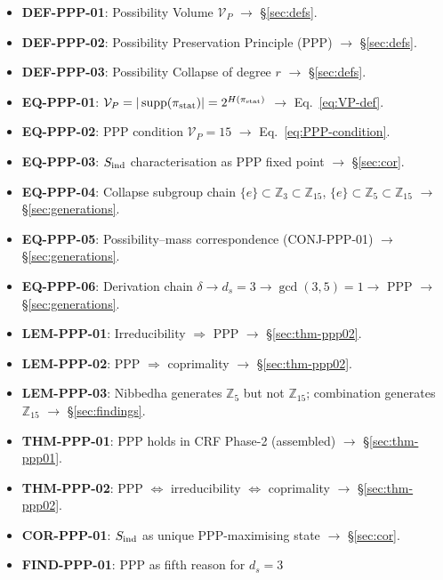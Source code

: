 \documentclass[12pt, a4paper]{article}
\begin{document}
\begin{formalbox}[title={Atomic units introduced by TASK-ZC13}]
\begin{itemize}[leftmargin=*]
  \item \textbf{DEF-PPP-01}: Possibility Volume $\mathcal{V}_P$
    $\to$ \S\ref{sec:defs}.
  \item \textbf{DEF-PPP-02}: Possibility Preservation Principle (PPP)
    $\to$ \S\ref{sec:defs}.
  \item \textbf{DEF-PPP-03}: Possibility Collapse of degree $r$
    $\to$ \S\ref{sec:defs}.
  \item \textbf{EQ-PPP-01}: $\mathcal{V}_P = |\operatorname{supp}
    (\pi_{\rm stat})| = 2^{H(\pi_{\rm stat})}$
    $\to$ Eq.~\eqref{eq:VP-def}.
  \item \textbf{EQ-PPP-02}: PPP condition $\mathcal{V}_P = 15$
    $\to$ Eq.~\eqref{eq:PPP-condition}.
  \item \textbf{EQ-PPP-03}: $S_{\rm ind}$ characterisation as
    PPP fixed point $\to$ \S\ref{sec:cor}.
  \item \textbf{EQ-PPP-04}: Collapse subgroup chain
    $\{e\} \subset \mathbb{Z}_3 \subset \mathbb{Z}_{15}$,
    $\{e\} \subset \mathbb{Z}_5 \subset \mathbb{Z}_{15}$
    $\to$ \S\ref{sec:generations}.
  \item \textbf{EQ-PPP-05}: Possibility--mass correspondence
    (CONJ-PPP-01) $\to$ \S\ref{sec:generations}.
  \item \textbf{EQ-PPP-06}: Derivation chain
    $\delta \to d_s=3 \to \gcd(3,5)=1 \to$ PPP
    $\to$ \S\ref{sec:generations}.
  \item \textbf{LEM-PPP-01}: Irreducibility $\Rightarrow$ PPP
    $\to$ \S\ref{sec:thm-ppp02}.
  \item \textbf{LEM-PPP-02}: PPP $\Rightarrow$ coprimality
    $\to$ \S\ref{sec:thm-ppp02}.
  \item \textbf{LEM-PPP-03}: Nibbedha generates $\mathbb{Z}_5$
    but not $\mathbb{Z}_{15}$; combination generates $\mathbb{Z}_{15}$
    $\to$ \S\ref{sec:findings}.
  \item \textbf{THM-PPP-01}: PPP holds in CRF Phase-2 (assembled)
    $\to$ \S\ref{sec:thm-ppp01}.
  \item \textbf{THM-PPP-02}: PPP $\Leftrightarrow$ irreducibility
    $\Leftrightarrow$ coprimality
    $\to$ \S\ref{sec:thm-ppp02}.
  \item \textbf{COR-PPP-01}: $S_{\rm ind}$ as unique PPP-maximising
    state $\to$ \S\ref{sec:cor}.
  \item \textbf{FIND-PPP-01}: PPP as fifth reason for $d_s = 3$

\end{itemize}
\end{formalbox}
\end{document}
